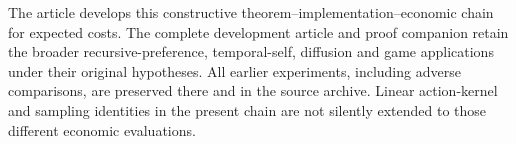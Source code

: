 The article develops this constructive theorem--implementation--economic chain for expected costs. The complete development article and proof companion retain the broader recursive-preference, temporal-self, diffusion and game applications under their original hypotheses. All earlier experiments, including adverse comparisons, are preserved there and in the source archive. Linear action-kernel and sampling identities in the present chain are not silently extended to those different economic evaluations.
